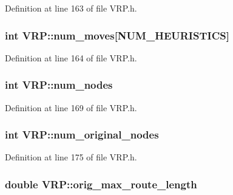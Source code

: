 Definition at line 163 of file VRP.h.

\hypertarget{class_v_r_p_ad2c3d755cc77b47e448d0c40dedaf4f2}{
\subsubsection[{num\_\-moves}]{\setlength{\rightskip}{0pt plus 5cm}int {\bf VRP::num\_\-moves}\mbox{[}NUM\_\-HEURISTICS\mbox{]}}}
\label{class_v_r_p_ad2c3d755cc77b47e448d0c40dedaf4f2}


Definition at line 164 of file VRP.h.

\hypertarget{class_v_r_p_a18aadb4711a9495b4f9c01d5ba839cde}{
\subsubsection[{num\_\-nodes}]{\setlength{\rightskip}{0pt plus 5cm}int {\bf VRP::num\_\-nodes}}}
\label{class_v_r_p_a18aadb4711a9495b4f9c01d5ba839cde}


Definition at line 169 of file VRP.h.

\hypertarget{class_v_r_p_aba1d749c32b7c7f03b4223d4e824c67f}{
\subsubsection[{num\_\-original\_\-nodes}]{\setlength{\rightskip}{0pt plus 5cm}int {\bf VRP::num\_\-original\_\-nodes}}}
\label{class_v_r_p_aba1d749c32b7c7f03b4223d4e824c67f}


Definition at line 175 of file VRP.h.

\hypertarget{class_v_r_p_a2697a8a76a766c0fec117719f719f402}{
\subsubsection[{orig\_\-max\_\-route\_\-length}]{\setlength{\rightskip}{0pt plus 5cm}double {\bf VRP::orig\_\-max\_\-route\_\-length}}}
\label{class_v_r_p_a2697a8a76a766c0fec117719f719f402}


